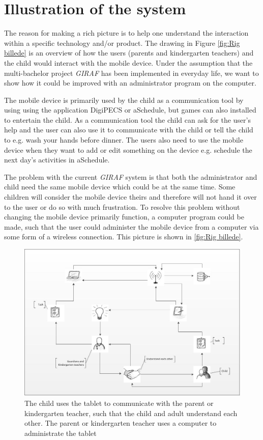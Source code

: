 \section{Illustration of the system}
The reason for making a rich picture is to help one understand the interaction within a specific technology and/or product\cite{OOAD}. The drawing in Figure \vref{fig:Rig billede} is an overview of how the users (parents and kindergarten teachers) and the child would interact with the mobile device. Under the assumption that the multi-bachelor project \textit{GIRAF} has been implemented in everyday life, we want to show how it could be improved with an administrator program on the computer.

The mobile device is primarily used by the child as a communication tool by using using the application DigiPECS or aSchedule, but games can also installed to entertain the child. As a communication tool the child can ask for the user's help and the user can also use it to communicate with the child or tell the child to e.g. wash your hands before dinner. 
The users also need to use the mobile device when they want to add or edit something on the device e.g. schedule the next day's activities in aSchedule.  

 
The problem with the current \textit{GIRAF} system is that both the administrator and child need the same mobile device which could be at the same time. Some children will consider the mobile device theirs and therefore will not hand it over to the user or do so with much frustration. To resolve this problem without changing the mobile device primarily function, a computer program could be made, such that the user could administer the mobile device from a computer via some form of a wireless connection. This picture is shown in \vref{fig:Rig billede}. 

\begin{figure}[ht]
	\centering
		\includegraphics[width=1.00\textwidth]{img/Rig_billede2.jpg}
	\caption{The child uses the tablet to communicate with the parent or kindergarten teacher, such that the child and adult understand each other. The parent or kindergarten teacher uses a computer to administrate the tablet}
	\label{fig:Rig billede}
\end{figure}

